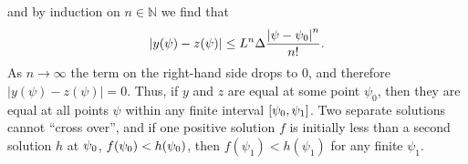 %
and by induction on $n\in\mathbb{N}$ we find that 
%
\begin{equation}
  \left|y(\psi)-z(\psi)\right| 
  \le
  L^n\Delta\frac{\left|\psi-\psi_0\right|^n}{n!}.
\end{equation}
%
As $n\to\infty$ the term on the right-hand side drops to $0$, and therefore $|y(\psi)-z(\psi)|=0$. Thus, if $y$ and $z$ are equal at some point $\psi_0$, then they are equal at all points $\psi$ within any finite interval $[\psi_0,\psi_1]$. Two separate solutions cannot ``cross over'', and if one positive solution $f$ is initially less than a second solution $h$ at $\psi_0$, $f(\psi_0)<h(\psi_0)$, then $f(\psi_1)<h(\psi_1)$ for any finite $\psi_1$.  

